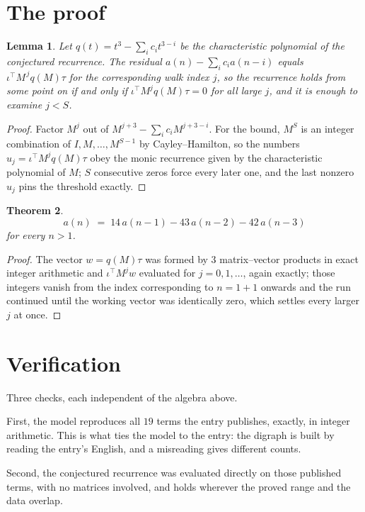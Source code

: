 \documentclass[11pt,a4paper]{article}
\theoremstyle{plain}
\newtheorem{theorem}{Theorem}
\newtheorem{lemma}[theorem]{Lemma}
\theoremstyle{definition}
\begin{document}
\section{The proof}

\begin{lemma}\label{lem:crit}
Let $q(t)=t^{3}-\sum_i c_it^{3-i}$ be the characteristic polynomial of the
conjectured recurrence. The residual $a(n)-\sum_ic_ia(n-i)$ equals
$\iota^{\!\top}M^{\,j}q(M)\tau$ for the corresponding walk index $j$, so the recurrence
holds from some point on if and only if $\iota^{\!\top}M^{j}q(M)\tau=0$ for all large $j$,
and it is enough to examine $j<S$.
\end{lemma}

\begin{proof}
Factor $M^{j}$ out of $M^{j+3}-\sum_ic_iM^{j+3-i}$. For the bound, $M^{S}$
is an integer combination of $I,M,\dots,M^{S-1}$ by Cayley--Hamilton, so the numbers
$u_j=\iota^{\!\top}M^{j}q(M)\tau$ obey the monic recurrence given by the characteristic
polynomial of $M$; $S$ consecutive zeros force every later one, and the last nonzero $u_j$
pins the threshold exactly.
\end{proof}

\begin{theorem}
\[
a(n)\;=\;14\,a(n-1) - 43\,a(n-2) - 42\,a(n-3)
\]
for every $n>1$.
\end{theorem}

\begin{proof}
The vector $w=q(M)\tau$ was formed by $3$ matrix--vector products in exact integer
arithmetic and $\iota^{\!\top}M^{j}w$ evaluated for $j=0,1,\dots$, again exactly; those
integers vanish from the index corresponding to $n=1+1$ onwards and the run continued
until the working vector was identically zero, which settles every larger $j$ at once.
\end{proof}

\section{Verification}

Three checks, each independent of the algebra above.

First, the model reproduces all $19$ terms the entry publishes, exactly, in integer
arithmetic. This is what ties the model to the entry: the digraph is built by reading the
entry's English, and a misreading gives different counts.

Second, the conjectured recurrence was evaluated directly on those published terms, with no
matrices involved, and holds wherever the proved range and the data overlap.
\end{document}
